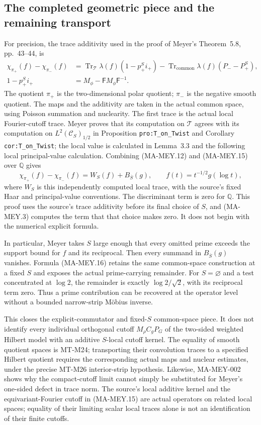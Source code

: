 \subsection{The completed geometric piece and the remaining transport}

For precision, the trace additivity used in the proof of
Meyer's Theorem~5.8, pp.~43--44, is
\begin{align*}
 \chi_{\pi_+}(f)-\chi_{\pi_-}(f)
 &=\operatorname{Tr}_{\mathcal T}
       \lambda(f)(1-p_+^Si_+)
       -\operatorname{Tr}_{\mathrm{common}}
          \lambda(f)(P_- -P_+^S),\\
 1-p_+^Si_+&=M_\phi-\mathsf F M_\phi\mathsf F^{-1}.
 \tag{MA-MEY.15}
\end{align*}
The quotient $\pi_+$ is the two-dimensional polar quotient;
$\pi_-$ is the negative smooth quotient.  The maps and the
additivity are taken in the actual common space, using Poisson
summation and nuclearity.  The first trace is the actual local
Fourier-cutoff trace.  Meyer proves that its computation on
$\mathcal T$ agrees with its computation on
$L^2(\mathcal C_S)_{1/2}$ in Proposition
\texttt{pro:T\_on\_Twist} and Corollary
\texttt{cor:T\_on\_Twist}; the local value is calculated in
Lemma~3.3 and the following local principal-value calculation.
Combining (MA-MEY.12) and (MA-MEY.15) over $\mathbb Q$ gives
\[
 \chi_{\pi_+}(f)-\chi_{\pi_-}(f)
   =W_S(f)+B_{\overline S}(g),
 \qquad f(t)=t^{-1/2}g(\log t),
 \tag{MA-MEY.16}
\]
where $W_S$ is this independently computed local trace, with
the source's fixed Haar and principal-value conventions.
The discriminant term is zero for $\mathbb Q$.  This proof
uses the source's trace additivity before its final choice of
$S$, and (MA-MEY.3) computes the term that that choice makes
zero.  It does not begin with the numerical explicit formula.

In particular, Meyer takes $S$ large enough that every omitted
prime exceeds the support bound for $f$ and its reciprocal.
Then every summand in $B_{\overline S}(g)$ vanishes.  Formula
(MA-MEY.16) retains the same common-space construction at a
fixed $S$ and exposes the actual prime-carrying remainder.
For $S=\varnothing$ and a test concentrated at $\log2$, the
remainder is exactly $\log2/\sqrt2$, with its reciprocal term
zero.  Thus a prime contribution can be recovered at the
operator level without a bounded narrow-strip M\"obius inverse.

This closes the explicit-commutator and fixed-$S$ common-space
piece.  It does not identify every individual orthogonal
cutoff $M_\rho C_gP_G$ of the two-sided weighted Hilbert model
with an additive $S$-local cutoff kernel.  The equality of
smooth quotient spaces is MT-M24; transporting their
convolution traces to a specified Hilbert quotient requires
the corresponding actual maps and nuclear estimates, under
the precise MT-M26 interior-strip hypothesis.  Likewise,
MA-MEY-002 shows why the compact-cutoff limit cannot simply
be substituted for Meyer's one-sided defect in trace norm.
The source's local additive kernel and the equivariant-Fourier
cutoff in (MA-MEY.15) are actual operators on related local
spaces; equality of their limiting scalar local traces alone
is not an identification of their finite cutoffs.

